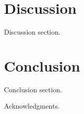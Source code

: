 \documentclass[twocolumn,prb]{revtex4-2}
\begin{document}
\section{Discussion}
\label{sec:discussion}
Discussion section.

\section{Conclusion}
\label{sec:conclusion}
Conclusion section.

\begin{acknowledgments}
  Acknowledgments.
\end{acknowledgments}


\end{document}
